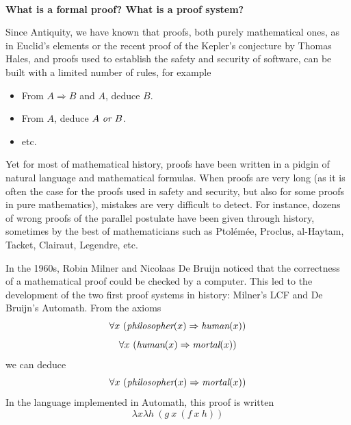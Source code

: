 \vfill~
\pagebreak
\begin{framed}
  \vspace*{-0.5cm}
  \begin{center}
    {\bf \Large What is a formal proof? What is a proof system?}
    \end{center}

Since Antiquity, we have known that
proofs, both purely mathematical ones, as in Euclid's elements or the
recent proof of the Kepler's conjecture by Thomas Hales, and proofs used
to establish the safety and security of software, can be built with a
limited number of rules, for example
\begin{itemize}
\item From $A \Rightarrow B$ and $A$, deduce $B$.
\item From $A$, deduce $A~\mbox{\it or}~B$.
\item etc.
\end{itemize}
Yet for most of mathematical history, proofs have been written in
a pidgin of natural language and mathematical formulas. When proofs are
very long (as it is often the case for the proofs used in safety and security,
but also for some proofs in pure mathematics), mistakes are
very difficult to detect. For instance, dozens of wrong proofs of
the parallel postulate have been given through history, sometimes by the
best of mathematicians such as Ptolémée, Proclus, al-Haytam, Tacket,
Clairaut, Legendre, etc.

In the 1960s, Robin Milner and Nicolaas De Bruijn noticed that the
correctness of a mathematical proof could be checked by a
computer. This led to the development of the two first proof systems
in history: Milner's LCF and De Bruijn's Automath.  From
the axioms
$$\forall x~(\mbox{\em philosopher}(x) \Rightarrow \mbox{\em human}(x))$$
$$\forall x~(\mbox{\em human}(x) \Rightarrow \mbox{\em mortal}(x))$$
we can deduce
$$\forall x~(\mbox{\em philosopher}(x) \Rightarrow \mbox{\em mortal}(x))$$
In the language implemented in Automath, this proof is written
$$\lambda x \lambda h~(g~x~(f~x~h))$$
\end{framed}

\vfill


